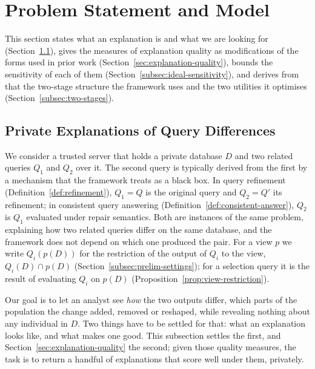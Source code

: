
\section{Problem Statement and Model}\label{sec:model}

This section states what an explanation is and what we are looking for (Section~\ref{subsec:private-query-difference-setting}), gives the measures of explanation quality as modifications of the forms used in prior work (Section~\ref{sec:explanation-quality}), bounds the sensitivity of each of them (Section~\ref{subsec:ideal-sensitivity}), and derives from that the two-stage structure the framework uses and the two utilities it optimises (Section~\ref{subsec:two-stages}).

\subsection{Private Explanations of Query Differences}
\label{subsec:private-query-difference-setting}

We consider a trusted server that holds a private database $D$ and two related queries $Q_1$ and $Q_2$ over it.
The second query is typically derived from the first by a mechanism that the framework treats as a black box.
In query refinement (Definition~\ref{def:refinement}), $Q_1=Q$ is the original query and $Q_2=Q'$ its refinement; in consistent query answering (Definition~\ref{def:consistent-answer}), $Q_2$ is $Q_1$ evaluated under repair semantics.
Both are instances of the same problem, explaining how two related queries differ on the same database, and the framework does not depend on which one produced the pair.
For a view $p$ we write $Q_i(p(D))$ for the restriction of the output of $Q_i$ to the view, $Q_i(D)\cap p(D)$ (Section~\ref{subsec:prelim-settings}); for a selection query it is the result of evaluating $Q_i$ on $p(D)$ (Proposition~\ref{prop:view-restriction}).

Our goal is to let an analyst see \emph{how} the two outputs differ, which parts of the population the change added, removed or reshaped, while revealing nothing about any individual in $D$.
Two things have to be settled for that: what an explanation looks like, and what makes one good.
This subsection settles the first, and Section~\ref{sec:explanation-quality} the second; given those quality measures, the task is to return a handful of explanations that score well under them, privately.

